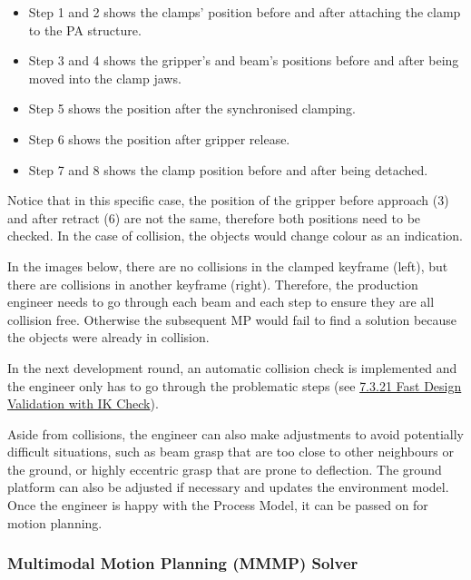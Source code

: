 \begin{itemize}
	\item Step 1 and 2 shows the clamps’ position before and after attaching the clamp to the PA structure. 

	\item Step 3 and 4 shows the gripper’s and beam’s positions before and after being moved into the clamp jaws. 

	\item Step 5 shows the position after the synchronised clamping.

	\item Step 6 shows the position after gripper release. 

	\item Step 7 and 8 shows the clamp position before and after being detached.

\end{itemize}
Notice that in this specific case, the position of the gripper before approach (3) and after retract (6) are not the same, therefore both positions need to be checked. In the case of collision, the objects would change colour as an indication.



In the images below, there are no collisions in the clamped keyframe (left), but there are collisions in another keyframe (right). Therefore, the production engineer needs to go through each beam and each step to ensure they are all collision free. Otherwise the subsequent MP would fail to find a solution because the objects were already in collision. 



In the next development round, an automatic collision check is implemented and the engineer only has to go through the problematic steps (see \ul{7.3.21 Fast Design Validation with IK Check}).

Aside from collisions, the engineer can also make adjustments to avoid potentially difficult situations, such as beam grasp that are too close to other neighbours or the ground, or highly eccentric grasp that are prone to deflection. The ground platform can also be adjusted if necessary and updates the environment model. Once the engineer is happy with the Process Model, it can be passed on for motion planning. 

\subsubsection{Multimodal Motion Planning (MMMP) Solver}


